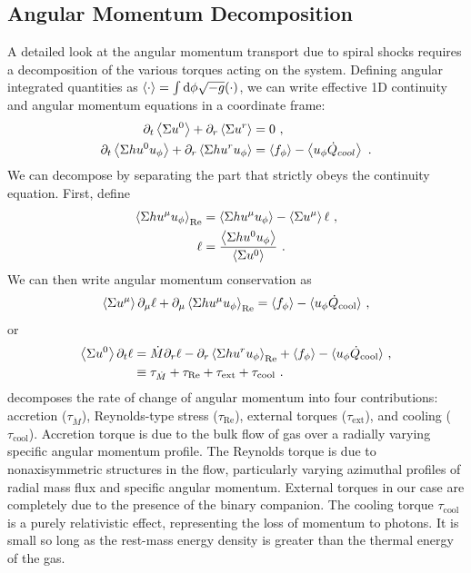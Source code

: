 \subsection{Angular Momentum Decomposition}

A detailed look at the angular momentum transport due to spiral shocks requires a decomposition of the various torques acting on the system. Defining angular integrated quantities as $\langle \cdot \rangle = \int \mathrm{d} \phi \sqrt{-g} (\cdot)$, we can write effective 1D continuity and angular momentum equations  in a coordinate frame:
\begin{align}
	\partial_t \ave{\Sig u^0} + \partial_r \ave{\Sig u^r} &= 0 \ ,\eqlabel{aveAng}\\
	\partial_t \ave{\Sig h u^0 u_\phi} + \partial_r \ave{\Sig h u^r u_\phi} &= \ave{f_\phi}- \ave{u_\phi \dot{Q}_{cool}} \ .\nonumber
\end{align} 
We can decompose  by separating the part that strictly obeys the continuity equation.  First, define
\begin{align*}
	\left \langle \Sigma h u^\mu u_\phi \right \rangle_\text{Re} &= \left \langle \Sigma h u^\mu u_\phi \right \rangle - \left \langle \Sigma u^\mu \right \rangle \ell \ , \\
	\ell &= \frac{\left \langle \Sigma h u^0 u_\phi \right \rangle}{\left \langle \Sigma u^0 \right \rangle } \ .
\end{align*}
We can then write angular momentum conservation as
\begin{equation}
	\left \langle \Sigma u^\mu \right \rangle \partial_\mu \ell + \partial_\mu \left \langle \Sigma h u^\mu u_\phi \right \rangle_\text{Re} =  \left \langle f_\phi \right \rangle- \langle u_\phi \dot{Q}_\text{cool} \rangle \ , 
\end{equation}
or
\begin{align}
	\ave{\Sig u^0} \partial_t \ell &= \dot{M} \partial_r \ell -  \partial_r \aveRe{\Sig h u^r u_\phi} +  \ave{f_\phi}- \langle u_\phi \dot{Q}_\text{cool} \rangle \ , \nonumber \\
	&\equiv \tau_{\dot{M}} + \tau_\text{Re} + \tau_\text{ext} + \tau_\text{cool} \ . \eqlabel{angMomDecom}
\end{align} 
 decomposes the rate of change of angular momentum into four contributions: accretion ($\tau_{\dot{M}}$), Reynolds-type stress ($\tau_\text{Re}$), external torques ($\tau_\text{ext}$), and cooling ($\tau_\text{cool}$).  Accretion torque is due to the bulk flow of gas over a radially varying specific angular momentum profile. The Reynolds torque is due to nonaxisymmetric structures in the flow, particularly varying azimuthal profiles of radial mass flux and specific angular momentum. External torques in our case are completely due to the presence of the binary companion. The cooling torque $\tau_\text{cool}$ is a purely relativistic effect, representing the loss of momentum to photons. It is small so long as the rest-mass energy density is greater than the thermal energy of the gas.

